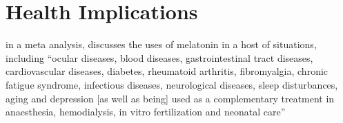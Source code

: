 \section{Health Implications}
\label{Sec:Health}


 in a meta analysis, \citet{sanchez-barceloClinicalUsesMelatonin2010} discusses the uses of melatonin in a host of situations, including ``ocular diseases, blood diseases, gastrointestinal tract diseases, cardiovascular diseases, diabetes, rheumatoid arthritis, fibromyalgia, chronic fatigue syndrome, infectious diseases, neurological diseases, sleep disturbances, aging and depression [as well as being] used as a complementary treatment in anaesthesia, hemodialysis, in vitro fertilization and neonatal care''




%



%
%
%




